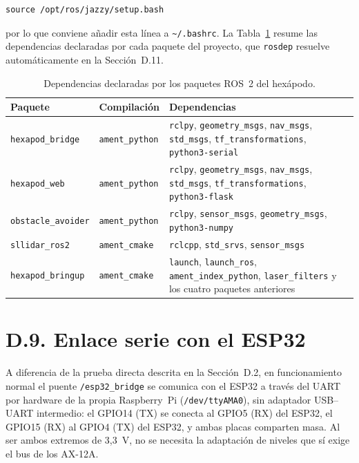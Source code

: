 \begin{lstlisting}[basicstyle=\ttfamily\small,frame=single]
source /opt/ros/jazzy/setup.bash
\end{lstlisting}

por lo que conviene añadir esta línea a \texttt{\textasciitilde/.bashrc}. La
Tabla~\ref{tab:manual_deps_ros2} resume las dependencias declaradas por cada
paquete del proyecto, que \texttt{rosdep} resuelve automáticamente en la
Sección~D.11.

\begin{table}[H]
    \centering
    \small
    \begin{tabularx}{\textwidth}{@{}l l X@{}}
        \toprule
        \textbf{Paquete} & \textbf{Compilación} & \textbf{Dependencias} \\
        \midrule
        \texttt{hexapod\_bridge} & \texttt{ament\_python} & \texttt{rclpy}, \texttt{geometry\_msgs}, \texttt{nav\_msgs}, \texttt{std\_msgs}, \texttt{tf\_transformations}, \texttt{python3-serial} \\
        \texttt{hexapod\_web} & \texttt{ament\_python} & \texttt{rclpy}, \texttt{geometry\_msgs}, \texttt{nav\_msgs}, \texttt{std\_msgs}, \texttt{tf\_transformations}, \texttt{python3-flask} \\
        \texttt{obstacle\_avoider} & \texttt{ament\_python} & \texttt{rclpy}, \texttt{sensor\_msgs}, \texttt{geometry\_msgs}, \texttt{python3-numpy} \\
        \texttt{sllidar\_ros2} & \texttt{ament\_cmake} & \texttt{rclcpp}, \texttt{std\_srvs}, \texttt{sensor\_msgs} \\
        \texttt{hexapod\_bringup} & \texttt{ament\_cmake} & \texttt{launch}, \texttt{launch\_ros}, \texttt{ament\_index\_python}, \texttt{laser\_filters} y los cuatro paquetes anteriores \\
        \bottomrule
    \end{tabularx}
    \caption{Dependencias declaradas por los paquetes ROS~2 del hexápodo.}
    \label{tab:manual_deps_ros2}
\end{table}

\section*{D.9. Enlace serie con el ESP32}

A diferencia de la prueba directa descrita en la Sección~D.2, en funcionamiento
normal el puente \texttt{/esp32\_bridge} se comunica con el ESP32 a través del
UART por hardware de la propia Raspberry~Pi (\texttt{/dev/ttyAMA0}), sin
adaptador USB--UART intermedio: el GPIO14 (TX) se conecta al GPIO5 (RX) del
ESP32, el GPIO15 (RX) al GPIO4 (TX) del ESP32, y ambas placas comparten masa.
Al ser ambos extremos de 3,3~V, no se necesita la adaptación de niveles que sí
exige el bus de los AX-12A.

